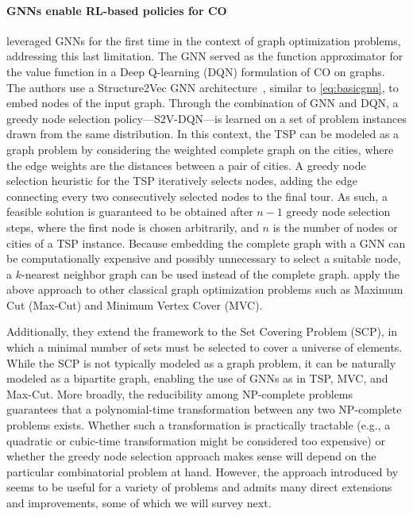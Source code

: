 \documentclass[twoside,11pt]{article}
\begin{document}
\paragraph{GNNs enable RL-based policies for CO} \citet{Khalil2017} leveraged GNNs for the first time in the context of graph optimization problems, addressing this last limitation. The GNN served as the function approximator for the value function in a Deep Q-learning (DQN) formulation of CO on graphs. The authors use a Structure2Vec GNN architecture~\citep{Dai2016}, similar to \cref{eq:basicgnn}, to embed nodes of the input graph. Through the combination of GNN and DQN, a greedy node selection policy---S2V-DQN---is learned on a set of problem instances drawn from the same distribution. In this context, the TSP can be modeled as a graph problem by considering the weighted complete graph on the cities, where the edge weights are the distances between a pair of cities. A greedy node selection heuristic for the TSP iteratively selects nodes, adding the edge connecting every two consecutively selected nodes to the final tour. As such, a feasible solution is guaranteed to be obtained after $n-1$ greedy node selection steps, where the first node is chosen arbitrarily, and $n$ is the number of nodes or cities of a TSP instance. Because embedding the complete graph with a GNN can be computationally expensive and possibly unnecessary to select a suitable node, a $k$-nearest neighbor graph can be used instead of the complete graph. \citet{Khalil2017} apply the above approach to other classical graph optimization problems such as Maximum Cut (Max-Cut) and Minimum Vertex Cover (MVC).

Additionally, they extend the framework to the Set Covering Problem (SCP), in which a minimal number of sets must be selected to cover a universe of elements. While the SCP is not typically modeled as a graph problem, it can be naturally modeled as a bipartite graph, enabling the use of GNNs as in TSP, MVC, and Max-Cut. More broadly, the reducibility among \textsf{NP}-complete problems~\citep{karp1972reducibility} guarantees that a polynomial-time transformation between any two \textsf{NP}-complete problems exists. Whether such a transformation is practically tractable (e.g., a quadratic or cubic-time transformation might be considered too expensive) or whether the greedy node selection approach makes sense will depend on the particular combinatorial problem at hand. However, the approach introduced by \citet{Khalil2017} seems to be useful for a variety of problems and admits many direct extensions and improvements, some of which we will survey next.
\end{document}
